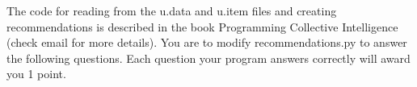 \documentclass[]{svmono}
\begin{document}
The code for reading from the u.data and u.item files and creating
recommendations is described in the book Programming Collective
Intelligence (check email for more details). You are to modify
recommendations.py to answer the following questions. Each question your
program answers correctly will award you 1 point.












%
%















\end{document}
